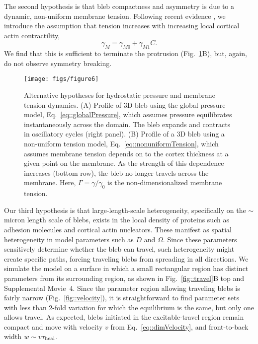 The second hypothesis is that bleb compactness and asymmetry is due to a dynamic, non-uniform membrane tension. Following recent evidence \cite{Peukes:2014fw}, we introduce the assumption that tension increases with increasing local cortical actin contractility,
\begin{equation}
\gamma_M = \gamma_{M0} + \gamma_{M1} C\label{eq::nonuniformTension}. 
\end{equation}
We find that this is sufficient to terminate the protrusion (Fig.~\ref{fig::variants}B), but, again, do not observe symmetry breaking.

\begin{figure}
   \begin{center}
   \captionsetup{width=17cm}
     \texttt{[image: figs/figure6]}
      \caption{Alternative hypotheses for hydrostatic pressure and membrane tension dynamics. (A) Profile of 3D bleb using the global pressure model, Eq.~\ref{eq::globalPressure}, which assumes pressure equilibrates instantaneously across the domain. The bleb expands and contracts in oscillatory cycles (right panel). (B) Profile  of a 3D bleb using a non-uniform tension model, Eq.~\ref{eq::nonuniformTension}, which assumes membrane tension depends on to the cortex thickness at a given point on the membrane. As the strength of this dependence increases (bottom row), the bleb no longer travels across the membrane. Here, $\Gamma = \gamma/\gamma_0$ is the non-dimensionalized membrane tension.}
      \label{fig::variants}
   \end{center}
\end{figure}

Our third hypothesis is that large-length-scale heterogeneity, specifically on the $\sim$ micron length scale of blebs, exists in the local density of proteins such as adhesion molecules and cortical actin nucleators. These manifest as spatial heterogeneity in model parameters such as $D$ and $\Omega$. Since these parameters sensitively determine whether the bleb can travel, such heterogeneity might create specific paths, forcing traveling blebs from spreading in all directions. We simulate the model on a surface in which a small rectangular region has distinct parameters from its surrounding region, as shown in Fig.~\ref{fig::travel}B top and Supplemental Movie~4. Since the parameter region allowing traveling blebs is fairly narrow (Fig.~\ref{fig::velocity}), it is straightforward to find parameter sets with less than 2-fold variation for which the equilibrium is the same, but only one allows travel. As expected, blebs initiated in the excitable-travel region remain compact and move with velocity $v$ from Eq.~\ref{eq::dimVelocity}, and front-to-back width $w\sim v\tau_{\mbox{\scriptsize heal}}$. 

